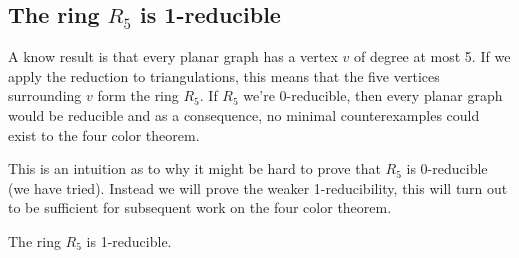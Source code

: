 \subsection{The ring $R_5$ is 1-reducible}

A know result is that every planar graph has a vertex $v$ of degree at most 5. If we apply the reduction to triangulations, this means that the five vertices surrounding $v$ form the ring $R_5$. If $R_5$ we're 0-reducible, then every planar graph would be reducible and as a consequence, no minimal counterexamples could exist to the four color theorem.

This is an intuition as to why it might be hard to prove that $R_5$ is 0-reducible (we have tried). Instead we will prove the weaker 1-reducibility, this will turn out to be sufficient for subsequent work on the four color theorem.

\begin{theorem}
    The ring $R_5$ is 1-reducible.
\end{theorem}

